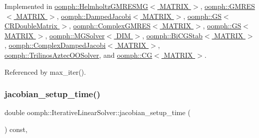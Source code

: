 Implemented in \hyperlink{classoomph_1_1HelmholtzGMRESMG_ad2ae5c641eae7da8c7556b646fe38d36}{oomph\+::\+Helmholtz\+G\+M\+R\+E\+S\+M\+G$<$ M\+A\+T\+R\+I\+X $>$}, \hyperlink{classoomph_1_1GMRES_a879927e08b79ad4744a10b360ccd5ff3}{oomph\+::\+G\+M\+R\+E\+S$<$ M\+A\+T\+R\+I\+X $>$}, \hyperlink{classoomph_1_1DampedJacobi_aa72fe9dcf19728a8b5a75f0cadb36013}{oomph\+::\+Damped\+Jacobi$<$ M\+A\+T\+R\+I\+X $>$}, \hyperlink{classoomph_1_1GS_3_01CRDoubleMatrix_01_4_a0fe8a3e90df149b2ad6a247afe1adf2a}{oomph\+::\+G\+S$<$ C\+R\+Double\+Matrix $>$}, \hyperlink{classoomph_1_1ComplexGMRES_a10760c61c62771773e2adc57055717aa}{oomph\+::\+Complex\+G\+M\+R\+E\+S$<$ M\+A\+T\+R\+I\+X $>$}, \hyperlink{classoomph_1_1GS_ad182a2d91cb9d629cb516102f9a3c649}{oomph\+::\+G\+S$<$ M\+A\+T\+R\+I\+X $>$}, \hyperlink{classoomph_1_1MGSolver_ace1b91d44c67c990259807ee746a6363}{oomph\+::\+M\+G\+Solver$<$ D\+I\+M $>$}, \hyperlink{classoomph_1_1BiCGStab_a2550adba752e02423254dc0a6c592f7f}{oomph\+::\+Bi\+C\+G\+Stab$<$ M\+A\+T\+R\+I\+X $>$}, \hyperlink{classoomph_1_1ComplexDampedJacobi_a34e565b3536b286b5544f5e30935b9e9}{oomph\+::\+Complex\+Damped\+Jacobi$<$ M\+A\+T\+R\+I\+X $>$}, \hyperlink{classoomph_1_1TrilinosAztecOOSolver_aaa90619b05f448d7bd610f474a9f750d}{oomph\+::\+Trilinos\+Aztec\+O\+O\+Solver}, and \hyperlink{classoomph_1_1CG_a17db796814dc11cb67eac960df85d5f7}{oomph\+::\+C\+G$<$ M\+A\+T\+R\+I\+X $>$}.



Referenced by max\+\_\+iter().

\mbox{\label{classoomph_1_1IterativeLinearSolver_aed10c606a26c8084e1fa482f3409f9b3}} 
\subsubsection{\texorpdfstring{jacobian\+\_\+setup\+\_\+time()}{jacobian\_setup\_time()}}
{\footnotesize\ttfamily double oomph\+::\+Iterative\+Linear\+Solver\+::jacobian\+\_\+setup\+\_\+time (\begin{DoxyParamCaption}{ }\end{DoxyParamCaption}) const\hspace{0.3cm}{\ttfamily [inline]}, {\ttfamily [virtual]}}



